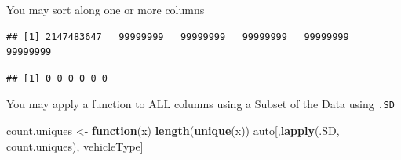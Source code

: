 \documentclass[]{book}
\newenvironment{Shaded}{\begin{snugshade}}{\end{snugshade}}
\newcommand{\CommentTok}[1]{\textcolor[rgb]{0.56,0.35,0.01}{\textit{#1}}}
\newcommand{\ControlFlowTok}[1]{\textcolor[rgb]{0.13,0.29,0.53}{\textbf{#1}}}
\newcommand{\KeywordTok}[1]{\textcolor[rgb]{0.13,0.29,0.53}{\textbf{#1}}}
\newcommand{\NormalTok}[1]{#1}
\newcommand{\OperatorTok}[1]{\textcolor[rgb]{0.81,0.36,0.00}{\textbf{#1}}}
\newcommand{\StringTok}[1]{\textcolor[rgb]{0.31,0.60,0.02}{#1}}
\theoremstyle{definition}
\theoremstyle{definition}
\theoremstyle{definition}
\theoremstyle{remark}
\begin{document}
You may sort along one or more columns

\begin{Shaded}
\end{Shaded}

\begin{verbatim}
## [1] 2147483647   99999999   99999999   99999999   99999999   99999999
\end{verbatim}

\begin{Shaded}
\end{Shaded}

\begin{verbatim}
## [1] 0 0 0 0 0 0
\end{verbatim}

You may apply a function to ALL columns using a Subset of the Data using \texttt{.SD}

\begin{Shaded}
\begin{Highlighting}[]
\NormalTok{count.uniques <-}\StringTok{ }\ControlFlowTok{function}\NormalTok{(x) }\KeywordTok{length}\NormalTok{(}\KeywordTok{unique}\NormalTok{(x))}
\NormalTok{auto[,}\KeywordTok{lapply}\NormalTok{(.SD, count.uniques), vehicleType]}
\end{Highlighting}
\end{Shaded}
\end{document}
